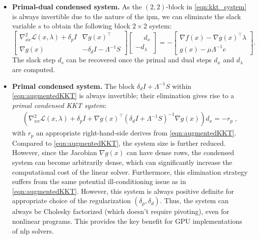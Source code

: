 \documentclass{article}
\begin{document}
\begin{itemize}[leftmargin=*,itemsep=0pt,parsep=0pt,partopsep=0pt]
\item \textbf{Primal-dual condensed system.}
As the $(2,2)$-block in \cref{eqn:kkt_system} is always invertible due to the nature of the \gls*{ipm}, we can eliminate the slack variable $s$ to obtain the following block $2\times 2$ system:
\begin{equation}\label{eqn:augmentedKKT}
  \begin{bmatrix}
    \nabla^2_{x x} \mathcal{L}(x,\lambda) + \delta_p I & \nabla g(x)^\top \\
    \nabla g(x) &  - \delta_d I - \Lambda^{-1} S
  \end{bmatrix}
  \begin{bmatrix}
    \phantom{-}d_x\\
    - d_\lambda
  \end{bmatrix} =
  -\begin{bmatrix}
    \nabla f(x) - \nabla g(x)^\top \lambda\\
    g(x) - \mu \Lambda^{-1} e
  \end{bmatrix}.
\end{equation}
The slack step $d_s$ can be recovered once the primal and dual steps $d_x$ and $d_\lambda$ are computed.

\item \textbf{Primal condensed system.}
The block $\delta_d I + \Lambda^{-1}S$ within \eqref{eqn:augmentedKKT} is always invertible; their elimination gives rise to a \emph{primal condensed KKT system}:
\begin{align}\label{eqn:kkt_primal}
  \left(\nabla^2_{x x} \mathcal{L}(x, \lambda) + \delta_p I + \nabla g(x)^\top (\delta_d I + \Lambda^{-1} S)^{-1} \nabla g(x)  \right) d_x = - r_p \; ,
\end{align}
with $r_p$ an appropriate right-hand-side derives from \eqref{eqn:augmentedKKT}.
Compared to \cref{eqn:augmentedKKT}, the system size is further reduced.
However, since the Jacobian $\nabla g(x)$ can have dense rows, the condensed system can become arbitrarily dense, which can significantly increase the computational cost of the linear solver. Furthermore, this elimination strategy suffers from the same potential ill-conditioning issue as in \cref{eqn:augmentedKKT}.
However, this system is always positive definite for appropriate choice of the
regularization $(\delta_p, \delta_d)$.
Thus, the system can always be Cholesky factorized (which doesn't require pivoting), even for nonlinear programs.
This provides the key benefit for GPU implementations of \gls*{nlp} solvers.


\end{itemize}
\end{document}
